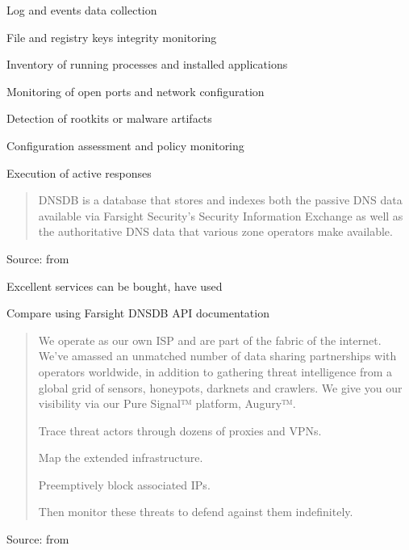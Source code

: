 \documentclass[Screen16to9,17pt]{foils}
\begin{document}
\begin{list2}
\item Log and events data collection
\item File and registry keys integrity monitoring
\item Inventory of running processes and installed applications
\item Monitoring of open ports and network configuration
\item Detection of rootkits or malware artifacts
\item Configuration assessment and policy monitoring
\item Execution of active responses
\end{list2}




\begin{quote}
DNSDB is a database that stores and indexes both the passive DNS data available via Farsight Security’s Security Information Exchange as well as the authoritative DNS data that various zone operators make available.
\end{quote}
Source: from 
\begin{list2}
  \item Excellent services can be bought, have used 
\item Compare using 
  Farsight DNSDB API documentation
\item {}

\end{list2}



\begin{quote}
  We operate as our own ISP and are part of the fabric of the internet. We’ve amassed an unmatched number of data sharing partnerships with operators worldwide, in addition to gathering threat intelligence from a global grid of sensors, honeypots, darknets and crawlers. We give you our visibility via our Pure Signal™ platform, Augury™.

\begin{list2}
\item Trace threat actors through dozens of proxies and VPNs.
\item Map the extended infrastructure.
\item Preemptively block associated IPs.
\item Then monitor these threats to defend against them indefinitely.
\end{list2}
\end{quote}
Source: from 
\end{document}
